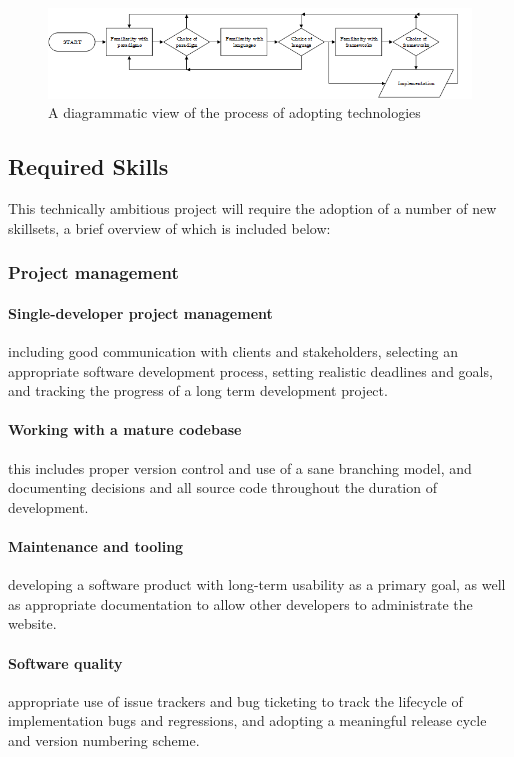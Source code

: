 \begin{figure}[H]
\centering
\includegraphics{assets/flow-tech-choices.png}
\caption{A diagrammatic view of the process of adopting technologies}
\label{fig:flow-tech-choices}
\end{figure}

\subsection{Required Skills}
This technically ambitious project will require the adoption of a number of new
skillsets, a brief overview of which is included below:

\subsubsection{Project management}

\paragraph{Single-developer project management} including good communication
with clients and stakeholders, selecting an appropriate software development
process, setting realistic deadlines and goals, and tracking the progress of a
long term development project.

\paragraph{Working with a mature codebase} this includes proper version control
and use of a sane branching model, and documenting decisions and all source code
throughout the duration of development.

\paragraph{Maintenance and tooling} developing a software product with long-term
usability as a primary goal, as well as appropriate documentation to allow other
developers to administrate the website.

\paragraph{Software quality} appropriate use of issue trackers and bug ticketing
to track the lifecycle of implementation bugs and regressions, and adopting a
meaningful release cycle and version numbering scheme.

